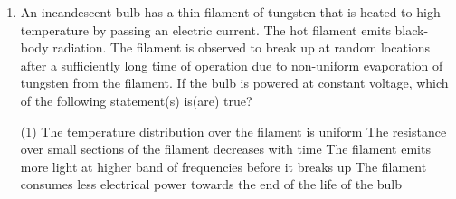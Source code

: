 \documentclass{article}
\begin{document}
\begin{enumerate}
    \item An incandescent bulb has a thin filament of tungsten that is heated to high temperature by passing an electric current. The hot filament emits black-body radiation. The filament is observed to break up at random locations after a sufficiently long time of operation due to non-uniform evaporation of tungsten from the filament. If the bulb is powered at constant voltage, which of the following statement(s) is(are) true?
        \begin{tasks}(1)
            \task The temperature distribution over the filament is uniform
            \task The resistance over small sections of the filament decreases with time
            \task The filament emits more light at higher band of frequencies before it breaks up
            \task The filament consumes less electrical power towards the end of the life of the bulb
        \end{tasks}
\end{enumerate}
\end{document}
